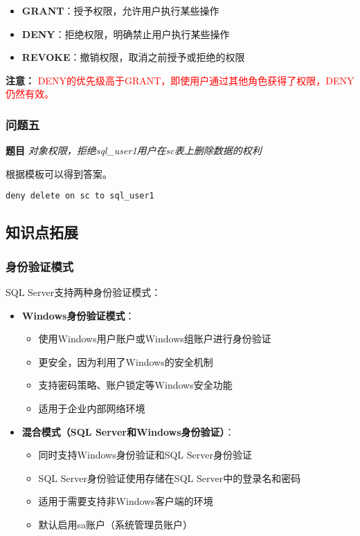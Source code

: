 \begin{itemize}
  \item \textbf{GRANT}：授予权限，允许用户执行某些操作
  \item \textbf{DENY}：拒绝权限，明确禁止用户执行某些操作
  \item \textbf{REVOKE}：撤销权限，取消之前授予或拒绝的权限
\end{itemize}

\textbf{注意：} \textcolor{Red}{DENY的优先级高于GRANT，即使用户通过其他角色获得了权限，DENY仍然有效。}

\subsubsection{问题五}

\textbf{题目} \emph{对象权限，拒绝sql\_user1用户在sc表上删除数据的权利}

\vspace{6pt}

\qquad 根据模板可以得到答案。

\begin{mdframed}[backgroundcolor=blue!5]
\begin{verbatim}
deny delete on sc to sql_user1
\end{verbatim}
\end{mdframed}

\subsection{知识点拓展}

\subsubsection{身份验证模式}

\qquad SQL Server支持两种身份验证模式：

\begin{itemize}
  \item \textbf{Windows身份验证模式}：
    \begin{itemize}
      \item 使用Windows用户账户或Windows组账户进行身份验证
      \item 更安全，因为利用了Windows的安全机制
      \item 支持密码策略、账户锁定等Windows安全功能
      \item 适用于企业内部网络环境
    \end{itemize}

  \item \textbf{混合模式（SQL Server和Windows身份验证）}：
    \begin{itemize}
      \item 同时支持Windows身份验证和SQL Server身份验证
      \item SQL Server身份验证使用存储在SQL Server中的登录名和密码
      \item 适用于需要支持非Windows客户端的环境
      \item 默认启用sa账户（系统管理员账户）
    \end{itemize}
\end{itemize}

